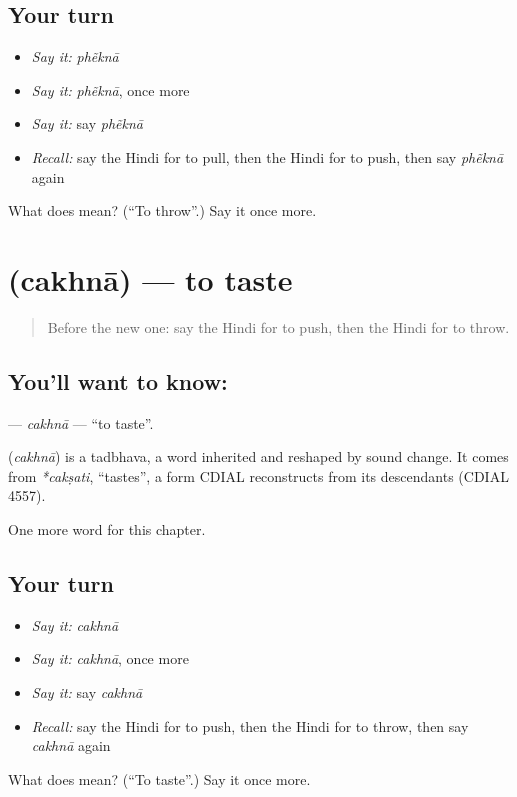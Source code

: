 \subsection*{Your turn}
\begin{itemize}
\raggedright
  \item \emph{Say it:} \emph{phẽknā}
  \item \emph{Say it:} \emph{phẽknā}, once more
  \item \emph{Say it:} say \emph{phẽknā}
  \item \emph{Recall:} say the Hindi for to pull, then the Hindi for to push, then say \emph{phẽknā} again
\end{itemize}

\begin{tcolorbox}[breakable,colback=teal!4,colframe=teal!35!black,title={Before you move on}]
What does  mean? (\textquotedblleft{}To throw\textquotedblright{}.) Say it once more.
\end{tcolorbox}
\section[\texorpdfstring{\hi{चखना} (cakhnā)}{चखना (cakhnā)}]{ (cakhnā) — to taste}

\label{lesson:HI-C176-cakhna}



\begin{quote}
Before the new one: say the Hindi for to push, then the Hindi for to throw.
\end{quote}

\subsection*{You'll want to know: }
\textbf{} — \emph{cakhnā} — \textquotedblleft{}to taste\textquotedblright{}.

\begin{cousinweb}
\textbf{} (\emph{cakhnā}) is a tadbhava, a word inherited and reshaped by sound change. It comes from \emph{*cakṣati}, \textquotedblleft{}tastes\textquotedblright{}, a form CDIAL reconstructs from its descendants (CDIAL 4557).
\end{cousinweb}

\begin{grammarlens}[title={What you've built}]
One more word for this chapter.
\end{grammarlens}

\subsection*{Your turn}
\begin{itemize}
\raggedright
  \item \emph{Say it:} \emph{cakhnā}
  \item \emph{Say it:} \emph{cakhnā}, once more
  \item \emph{Say it:} say \emph{cakhnā}
  \item \emph{Recall:} say the Hindi for to push, then the Hindi for to throw, then say \emph{cakhnā} again
\end{itemize}

\begin{tcolorbox}[breakable,colback=teal!4,colframe=teal!35!black,title={Before you move on}]
What does  mean? (\textquotedblleft{}To taste\textquotedblright{}.) Say it once more.
\end{tcolorbox}

